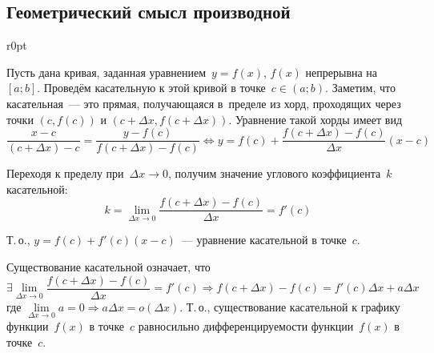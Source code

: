 \subsection{Геометрический смысл производной}
\begin{wrapfigure}{r}{0pt}
\noindent
{}
\end{wrapfigure}

Пусть дана кривая, заданная уравнением~$y = f(x)$, $f(x)$ непрерывна на~$[a; b]$.
Проведём касательную к этой кривой в точке~$c \in (a; b)$.
Заметим, что касательная~--- это прямая, получающаяся в~пределе из хорд, проходящих через точки $(c, f(c))$ и $(c + \Delta x, f(c + \Delta x))$.
Уравнение такой хорды имеет вид
\begin{equation*}
\frac{x - c}{(c + \Delta x) - c} = \frac{y - f(c)}{f(c + \Delta x) - f(c)} \Leftrightarrow
y = f(c) + \frac{f(c + \Delta x) - f(c)}{\Delta x} (x - c)
\end{equation*}

Переходя к пределу при~$\Delta x \to 0$, получим значение углового коэффициента~$k$ касательной:
\begin{equation*}
k = \lim_{\Delta x \to 0} \frac{f(c + \Delta x) - f(c)}{\Delta x} = f'(c)
\end{equation*}

Т.\,о., $y = f(c) + f'(c)(x - c)$~--- уравнение касательной в точке~$c$.

Существование касательной означает, что
\begin{equation*}
\displaystyle \exists \lim_{\Delta x \to 0} \frac{f(c + \Delta x) - f(c)}{\Delta x} = f'(c) \Rightarrow
f(c + \Delta x) - f(c) = f'(c) \Delta x + a\Delta x
\end{equation*}
где $\lim\limits_{\Delta x \to 0} a = 0 \Rightarrow a\Delta x = o(\Delta x)$.
Т.\,о., существование касательной к графику функции~$f(x)$ в точке~$c$ равносильно дифференцируемости функции~$f(x)$ в точке~$c$.

